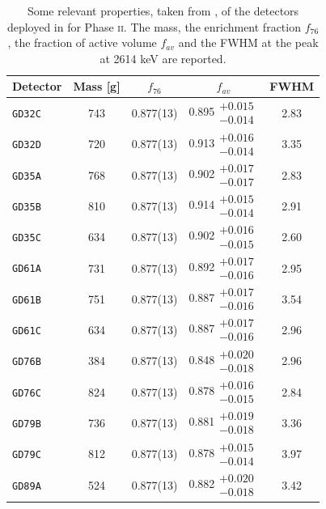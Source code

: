 \begin{table}
	\centering
		\caption{Some relevant properties, taken from \cite{GSTR-13-009,GSTR-16-002}, of the detectors deployed in {\gerda} for Phase \textsc{ii}. The mass, the enrichment fraction $f_{76}$, the fraction of active volume $f_{av}$ and the FWHM at the  peak at 2614 keV are reported.}\label{tab:gedet2}
	{\renewcommand{\arraystretch}{1.3}
	\begin{tabular}{lcccc}
		\toprule
		Detector		&	Mass [g]	&	$f_{76}$	&	$f_{av}$	&	FWHM \\
		\midrule
		\texttt{GD32C}	&	743 	&	0.877(13)	&	0.895$\substack{+0.015\\-0.014}$	&	2.83	\\
		\texttt{GD32D}	&	720 	&	0.877(13)	&	0.913$\substack{+0.016\\-0.014}$	&	3.35	\\
		\texttt{GD35A}	&	768 	&	0.877(13)	&	0.902$\substack{+0.017\\-0.017}$	&	2.83	\\
		\texttt{GD35B}	&	810 	&	0.877(13)	&	0.914$\substack{+0.015\\-0.014}$	&	2.91	\\
		\texttt{GD35C}	&	634 	&	0.877(13)	&	0.902$\substack{+0.016\\-0.015}$	&	2.60	\\
		\texttt{GD61A}	&	731 	&	0.877(13)	&	0.892$\substack{+0.017\\-0.016}$	&	2.95	\\
		\texttt{GD61B}	&	751 	&	0.877(13)	&	0.887$\substack{+0.017\\-0.016}$	&	3.54	\\
		\texttt{GD61C}	&	634 	&	0.877(13)	&	0.887$\substack{+0.017\\-0.016}$	&	2.96	\\
		\texttt{GD76B}	&	384 	&	0.877(13)	&	0.848$\substack{+0.020\\-0.018}$	&	2.96	\\
		\texttt{GD76C}	&	824 	&	0.877(13)	&	0.878$\substack{+0.016\\-0.015}$	&	2.84	\\
		\texttt{GD79B}	&	736 	&	0.877(13)	&	0.881$\substack{+0.019\\-0.018}$	&	3.36	\\
		\texttt{GD79C}	&	812 	&	0.877(13)	&	0.878$\substack{+0.015\\-0.014}$	&	3.97	\\
		\texttt{GD89A}	&	524 	&	0.877(13)	&	0.882$\substack{+0.020\\-0.018}$	&	3.42	\\

\end{tabular}}
\end{table}
